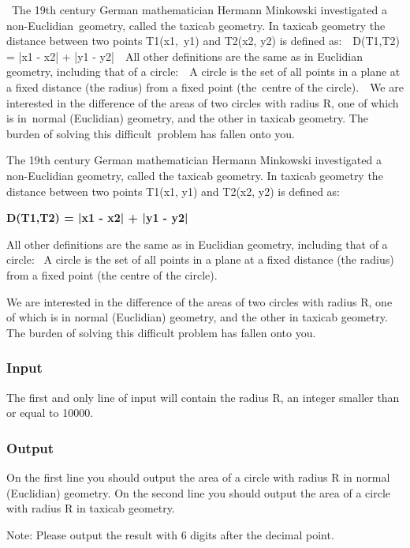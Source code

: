 

 The 19th century German mathematician Hermann Minkowski investigated a non-Euclidian geometry, called the taxicab geometry. In taxicab geometry the distance between two points T1(x1, y1) and T2(x2, y2) is defined as:  D(T1,T2) = |x1 - x2| + |y1 - y2|  All other definitions are the same as in Euclidian geometry, including that of a circle:  A circle is the set of all points in a plane at a fixed distance (the radius) from a fixed point (the centre of the circle).  We are interested in the difference of the areas of two circles with radius R, one of which is in normal (Euclidian) geometry, and the other in taxicab geometry. The burden of solving this difficult problem has fallen onto you.

The 19th century German mathematician Hermann Minkowski investigated a non-Euclidian geometry, called the taxicab geometry. In taxicab geometry the distance between two points T1(x1, y1) and T2(x2, y2) is defined as:

\textbf{D(T1,T2) = |x1 - x2| + |y1 - y2|  }

All other definitions are the same as in Euclidian geometry, including that of a circle:  A circle is the set of all points in a plane at a fixed distance (the radius) from a fixed point (the centre of the circle).

We are interested in the difference of the areas of two circles with radius R, one of which is in normal (Euclidian) geometry, and the other in taxicab geometry. The burden of solving this difficult problem has fallen onto you.

\subsubsection{Input}

The first and only line of input will contain the radius R, an integer smaller than or equal to 10000.

\subsubsection{Output}

On the first line you should output the area of a circle with radius R in normal (Euclidian) geometry. On the second line you should output the area of a circle with radius R in taxicab geometry.

Note: Please output the result with 6 digits after the decimal point.

 

